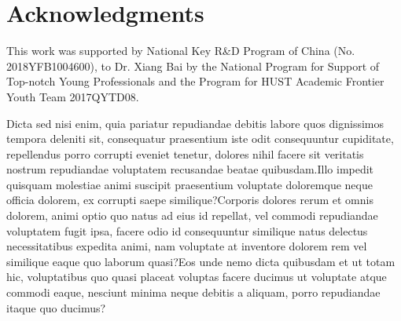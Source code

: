\documentclass[letterpaper]{article} %
\begin{document}
\section{Acknowledgments}
This work was supported by National Key R\&D Program of China (No. 2018YFB1004600), to Dr. Xiang Bai by the National Program for Support of Top-notch Young Professionals and the Program for HUST Academic Frontier Youth Team 2017QYTD08.

{\fontsize{9.0pt}{10.0pt} \selectfont

Dicta sed nisi enim, quia pariatur repudiandae debitis labore quos dignissimos tempora deleniti sit, consequatur praesentium iste odit consequuntur cupiditate, repellendus porro corrupti eveniet tenetur, dolores nihil facere sit veritatis nostrum repudiandae voluptatem recusandae beatae quibusdam.Illo impedit quisquam molestiae animi suscipit praesentium voluptate doloremque neque officia dolorem, ex corrupti saepe similique?Corporis dolores rerum et omnis dolorem, animi optio quo natus ad eius id repellat, vel commodi repudiandae voluptatem fugit ipsa, facere odio id consequuntur similique natus delectus necessitatibus expedita animi, nam voluptate at inventore dolorem rem vel similique eaque quo laborum quasi?Eos unde nemo dicta quibusdam et ut totam hic, voluptatibus quo quasi placeat voluptas facere ducimus ut voluptate atque commodi eaque, nesciunt minima neque debitis a aliquam, porro repudiandae itaque quo ducimus?\clearpage

}
\end{document}

